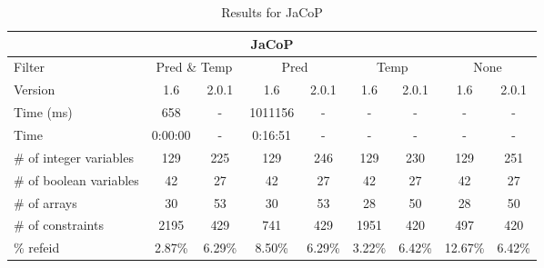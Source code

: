 \documentclass{standalone}
\begin{document}
\begin{table}[H]
\footnotesize
\centering
\begin{tabular}{lc|c|c|c|c|c|c|c}
\multicolumn{9}{c}{JaCoP} \\ 
\hline\hline Filter & \multicolumn{2}{c|}{Pred \& Temp} &\multicolumn{2}{c|}{Pred}  & \multicolumn{2}{c|}{Temp} & \multicolumn{2}{c}{None} \\ 
\hline Version & 1.6 & 2.0.1 & 1.6 & 2.0.1 & 1.6 & 2.0.1 & 1.6 & 2.0.1 \\ 
Time (ms)               & 658 & - & 1011156 & - & - & - & - & - \\
Time                    & 0:00:00 & - & 0:16:51 & - & - & - & - & - \\ 
\# of integer variables & 129 & 225 & 129 & 246 & 129 & 230 & 129 & 251 \\ 
\# of boolean variables & 42 & 27 & 42 & 27 & 42 & 27 & 42 & 27 \\ 
\# of arrays            & 30 & 53 & 30 & 53 & 28 & 50 & 28 & 50 \\ 
\# of constraints       & 2195 & 429 & 741 & 429 & 1951 & 420 & 497 & 420 \\ 
\% refeid               & 2.87\% & 6.29\% & 8.50\% & 6.29\% & 3.22\% & 6.42\% & 12.67\% & 6.42\% \\ 
\end{tabular}
\caption{Results for JaCoP}
\end{table}
\end{document}
